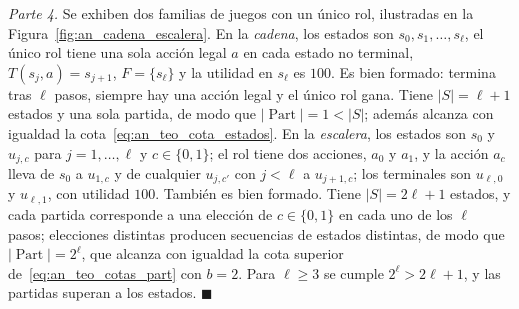 \emph{Parte 4.} Se exhiben dos familias de juegos con un único rol, ilustradas en la Figura~\ref{fig:an_cadena_escalera}. En la \emph{cadena}, los estados son $s_0, s_1, \dots, s_\ell$, el único rol tiene una sola acción legal $a$ en cada estado no terminal, $T(s_j, a) = s_{j+1}$, $F = \{s_\ell\}$ y la utilidad en $s_\ell$ es $100$. Es bien formado: termina tras $\ell$ pasos, siempre hay una acción legal y el único rol gana. Tiene $|S| = \ell + 1$ estados y una sola partida, de modo que $|\operatorname{Part}| = 1 < |S|$; además alcanza con igualdad la cota~\eqref{eq:an_teo_cota_estados}. En la \emph{escalera}, los estados son $s_0$ y $u_{j,c}$ para $j = 1, \dots, \ell$ y $c \in \{0, 1\}$; el rol tiene dos acciones, $a_0$ y $a_1$, y la acción $a_c$ lleva de $s_0$ a $u_{1,c}$ y de cualquier $u_{j,c'}$ con $j < \ell$ a $u_{j+1,c}$; los terminales son $u_{\ell,0}$ y $u_{\ell,1}$, con utilidad $100$. También es bien formado. Tiene $|S| = 2\ell + 1$ estados, y cada partida corresponde a una elección de $c \in \{0,1\}$ en cada uno de los $\ell$ pasos; elecciones distintas producen secuencias de estados distintas, de modo que $|\operatorname{Part}| = 2^{\ell}$, que alcanza con igualdad la cota superior de~\eqref{eq:an_teo_cotas_part} con $b = 2$. Para $\ell \ge 3$ se cumple $2^{\ell} > 2\ell + 1$, y las partidas superan a los estados. \hfill $\blacksquare$

